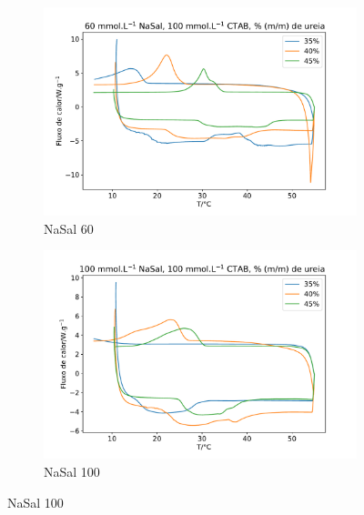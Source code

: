 \begin{figure}
	\begin{subfigure}{0.5\textwidth}
		\centering
		\includegraphics[width=\textwidth]{./imagens/dsc/NaSal60}
		\caption{NaSal 60\mM}
		\label{fig:DSC_NaSal60}
	\end{subfigure}  %
	\begin{subfigure}{0.5\textwidth}
		\centering
		\includegraphics[width=\textwidth]{./imagens/dsc/NaSal100}
		\caption{NaSal 100\mM}
		\label{fig:DSC_NaSal100}
	\end{subfigure}
	

\end{figure}
